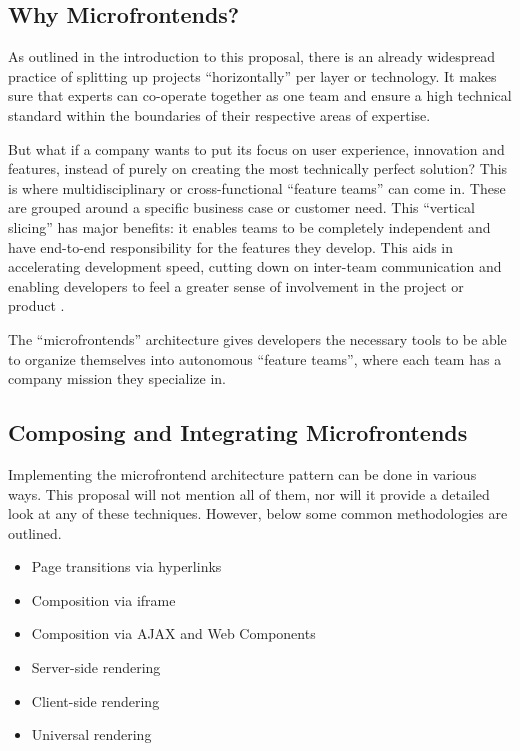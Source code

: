 \subsection{Why Microfrontends?}
As outlined in the introduction to this proposal, there is an already widespread
practice of splitting up projects ``horizontally'' per layer or technology. It
makes sure that experts can co-operate together as one team and ensure a high
technical standard within the boundaries of their respective areas of expertise.

But what if a company wants to put its focus on user experience, innovation and
features, instead of purely on creating the most technically perfect solution?
This is where multidisciplinary or cross-functional ``feature teams'' can come
in. These are grouped around a specific business case or customer need. This
``vertical slicing'' has major benefits: it enables teams to be completely
independent and have end-to-end responsibility for the features they develop.
This aids in accelerating development speed, cutting down on inter-team
communication and enabling developers to feel a greater sense of involvement in
the project or product \autocite{LarmanVodde_2008}.

The ``microfrontends'' architecture gives developers the necessary tools to be
able to organize themselves into autonomous ``feature teams'', where each team
has a company mission they specialize in. \autocite{Geers_2020}

\subsection{Composing and Integrating Microfrontends}
Implementing the microfrontend architecture pattern can be done in various
ways. This proposal will not mention all of them, nor will it provide a detailed
look at any of these techniques. However, below some common methodologies are
outlined. \autocite{Geers_2020} \autocite{Peltonen_etal_2020}
\autocite{Pavlenko_etal_2020}

\begin{itemize}
    \item Page transitions via hyperlinks
    \item Composition via iframe
    \item Composition via AJAX and Web Components
    \item Server-side rendering
    \item Client-side rendering
    \item Universal rendering
\end{itemize}


